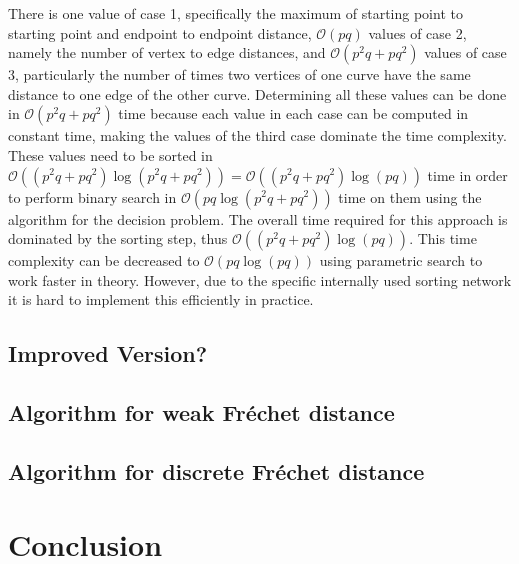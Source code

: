 \documentclass[
oneside,
fontsize=11pt
]{scrartcl}
\begin{document}
There is one value of case 1, 
specifically the maximum of starting point to starting point and endpoint to endpoint distance,
$\mathcal{O}(pq)$ values of case 2, 
namely the number of vertex to edge distances,
and $\mathcal{O}(p^2q + pq^2)$ values of case 3,
particularly the number of times two vertices of one curve have the same distance to one edge of the other curve.
Determining all these values can be done in $\mathcal{O}(p^2q + pq^2)$ time 
because each value in each case can be computed in constant time, 
making the values of the third case dominate the time complexity.
These values need to be sorted in $\mathcal{O}((p^2q + pq^2) \log (p^2q + pq^2)) = \mathcal{O}((p^2q + pq^2) \log (pq))$ time
in order to perform binary search in $\mathcal{O}(pq \log (p^2q + pq^2))$ time on them
using the algorithm for the decision problem.
The overall time required for this approach is dominated by the sorting step, 
thus $\mathcal{O}((p^2q + pq^2) \log (pq))$.
This time complexity can be decreased to $\mathcal{O}(pq \log (pq))$ 
using parametric search \cite{megiddo_applying_1983, cole_slowing_1987} to work faster in theory.
However, due to the specific internally used sorting network 
it is hard to implement this efficiently in practice. \cite{alt_computing_1995}




\subsection{Improved Version?}
\label{sec_improved_algorithm}

\subsection{Algorithm for weak Fréchet distance}

\subsection{Algorithm for discrete Fréchet distance}
\label{sec_discrete_algorithm}


\section{Conclusion}





\newpage
\appendix  %




\end{document}
